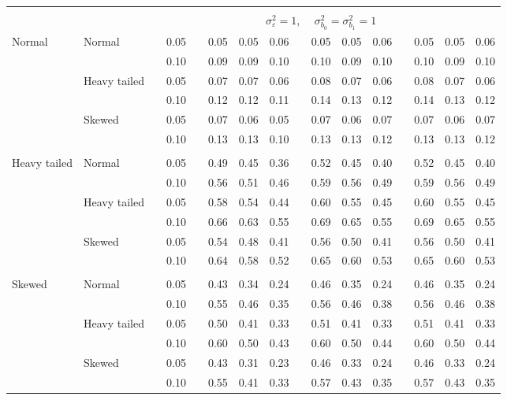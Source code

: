 \documentclass{article} %
\begin{document}
\begin{table}[ht]
\begin{scriptsize}
\begin{center}
\begin{tabular}{ll p{.1cm} c p{.1cm} rrr p{.1cm} rrr p{.1cm} rrr}
&&&&&&&&&&&&&&&\\
& && && \multicolumn{9}{c}{$\sigma_{\varepsilon}^2 = 1$, \ \ $\sigma_{b_0}^2 = \sigma_{b_1}^2 = 1$} \\ \cline{6-16}
\rowcolor{gray!20}Normal       & Normal       && 0.05 &&   0.05 & 0.05 & 0.06 && 0.05 & 0.05 & 0.06 && 0.05 & 0.05 & 0.06 \\ 
\rowcolor{gray!20}             &              && 0.10 &&   0.09 & 0.09 & 0.10 && 0.10 & 0.09 & 0.10 && 0.10 & 0.09 & 0.10 \\ 
\rowcolor{gray!20}             & Heavy tailed && 0.05 &&   0.07 & 0.07 & 0.06 && 0.08 & 0.07 & 0.06 && 0.08 & 0.07 & 0.06 \\ 
\rowcolor{gray!20}             &              && 0.10 &&   0.12 & 0.12 & 0.11 && 0.14 & 0.13 & 0.12 && 0.14 & 0.13 & 0.12 \\ 
\rowcolor{gray!20}             & Skewed       && 0.05 &&   0.07 & 0.06 & 0.05 && 0.07 & 0.06 & 0.07 && 0.07 & 0.06 & 0.07 \\ 
\rowcolor{gray!20}             &              && 0.10 &&   0.13 & 0.13 & 0.10 && 0.13 & 0.13 & 0.12 && 0.13 & 0.13 & 0.12 \\ 
             &&&&&&&&&&&&&&&\\
Heavy tailed & Normal       && 0.05 &&   0.49 & 0.45 & 0.36 && 0.52 & 0.45 & 0.40 && 0.52 & 0.45 & 0.40 \\ 
             &              && 0.10 &&   0.56 & 0.51 & 0.46 && 0.59 & 0.56 & 0.49 && 0.59 & 0.56 & 0.49 \\ 
             & Heavy tailed && 0.05 &&   0.58 & 0.54 & 0.44 && 0.60 & 0.55 & 0.45 && 0.60 & 0.55 & 0.45 \\ 
             &              && 0.10 &&   0.66 & 0.63 & 0.55 && 0.69 & 0.65 & 0.55 && 0.69 & 0.65 & 0.55 \\ 
             & Skewed       && 0.05 &&   0.54 & 0.48 & 0.41 && 0.56 & 0.50 & 0.41 && 0.56 & 0.50 & 0.41 \\ 
             &              && 0.10 &&   0.64 & 0.58 & 0.52 && 0.65 & 0.60 & 0.53 && 0.65 & 0.60 & 0.53 \\ 
             &&&&&&&&&&&&&&&\\
Skewed       & Normal       && 0.05 &&   0.43 & 0.34 & 0.24 && 0.46 & 0.35 & 0.24 && 0.46 & 0.35 & 0.24 \\ 
             &              && 0.10 &&   0.55 & 0.46 & 0.35 && 0.56 & 0.46 & 0.38 && 0.56 & 0.46 & 0.38 \\ 
             & Heavy tailed && 0.05 &&   0.50 & 0.41 & 0.33 && 0.51 & 0.41 & 0.33 && 0.51 & 0.41 & 0.33 \\ 
             &              && 0.10 &&   0.60 & 0.50 & 0.43 && 0.60 & 0.50 & 0.44 && 0.60 & 0.50 & 0.44 \\ 
             & Skewed       && 0.05 &&   0.43 & 0.31 & 0.23 && 0.46 & 0.33 & 0.24 && 0.46 & 0.33 & 0.24 \\ 
             &              && 0.10 &&   0.55 & 0.41 & 0.33 && 0.57 & 0.43 & 0.35 && 0.57 & 0.43 & 0.35 \\ 



\end{tabular}
\end{center}
\end{scriptsize}
\end{table}
\end{document}
